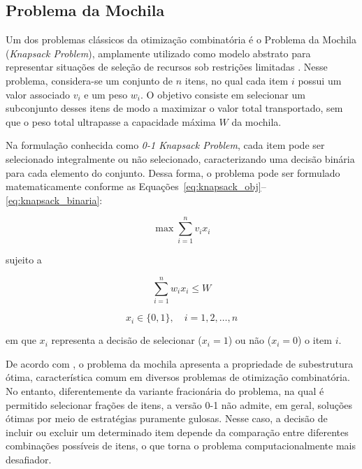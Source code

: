\subsection{Problema da Mochila}

Um dos problemas clássicos da otimização combinatória é o Problema da 
Mochila (\textit{Knapsack Problem}), amplamente utilizado como modelo abstrato 
para representar situações de seleção de recursos sob restrições limitadas \cite{Cormen2009}. 
Nesse problema, considera-se um conjunto de $n$ itens, no qual cada item $i$ possui um 
valor associado $v_i$ e um peso $w_i$. O objetivo consiste em selecionar um subconjunto 
desses itens de modo a maximizar o valor total transportado, sem que o peso total 
ultrapasse a capacidade máxima $W$ da mochila.

Na formulação conhecida como \textit{0-1 Knapsack Problem}, cada item pode ser 
selecionado integralmente ou não selecionado, caracterizando uma decisão binária para 
cada elemento do conjunto. Dessa forma, o problema pode ser formulado matematicamente 
conforme as Equações~\ref{eq:knapsack_obj}--\ref{eq:knapsack_binaria}:

\begin{equation}
\max \sum_{i=1}^{n} v_i x_i
\label{eq:knapsack_obj}
\end{equation}

sujeito a

\begin{equation}
\sum_{i=1}^{n} w_i x_i \leq W
\label{eq:knapsack_restricao}
\end{equation}

\begin{equation}
x_i \in \{0,1\}, \quad i = 1,2,\dots,n
\label{eq:knapsack_binaria}
\end{equation}

em que $x_i$ representa a decisão de selecionar ($x_i = 1$) ou não ($x_i = 0$) o item $i$.

De acordo com \cite{Cormen2009}, o problema da mochila apresenta a propriedade de subestrutura ótima, característica comum em diversos problemas
de otimização combinatória. No entanto, diferentemente da variante fracionária do problema, na qual é permitido selecionar frações de itens,
a versão 0-1 não admite, em geral, soluções ótimas por meio de estratégias puramente gulosas. Nesse caso, a decisão de incluir ou excluir um
determinado item depende da comparação entre diferentes combinações possíveis de itens, o que torna o problema computacionalmente mais desafiador.

